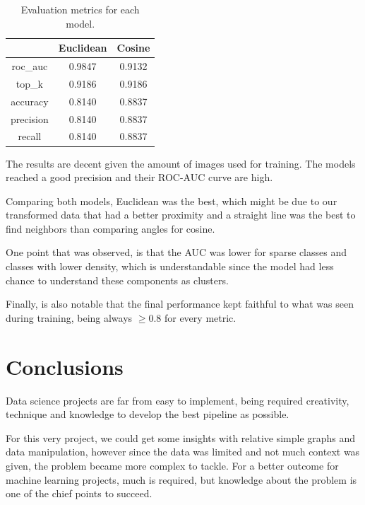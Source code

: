 \documentclass{article}
\begin{document}
\begin{table}[!h]
	\begin{center} 
		
		
		\begin{tabular}{ |c|c|c| } 
			\hline
			& Euclidean & Cosine \\
			\hline
			roc\_auc & 0.9847 & 0.9132 \\
			top\_k & 0.9186 & 0.9186 \\
			accuracy & 0.8140 & 0.8837 \\
			precision & 0.8140 & 0.8837 \\
			recall & 0.8140 & 0.8837 \\
			\hline
		\end{tabular}
		\caption{Evaluation metrics for each model.}
		\label{table-eval}
		
	\end{center}
\end{table}

The results are decent given the amount of images used for training. The models reached a good precision and their ROC-AUC curve are high.

Comparing both models, Euclidean was the best, which might be due to our transformed data that had a better proximity and a straight line was the best to find neighbors than comparing angles for cosine.

One point that was observed, is that the AUC was lower for sparse classes and classes with lower density, which is understandable since the model had less chance to understand these components as clusters. 

Finally, is also notable that the final performance kept faithful to what was seen during training, being always $\geq{0.8}$ for every metric.

\section{Conclusions} \label{sec4}

Data science projects are far from easy to implement, being required creativity, technique and knowledge to develop the best pipeline as possible.

For this very project, we could get some insights with relative simple graphs and data manipulation, however since the data was limited and not much context was given, the problem became more complex to tackle. For a better outcome for machine learning projects, much is required, but knowledge about the problem is one of the chief points to succeed.
\end{document}
